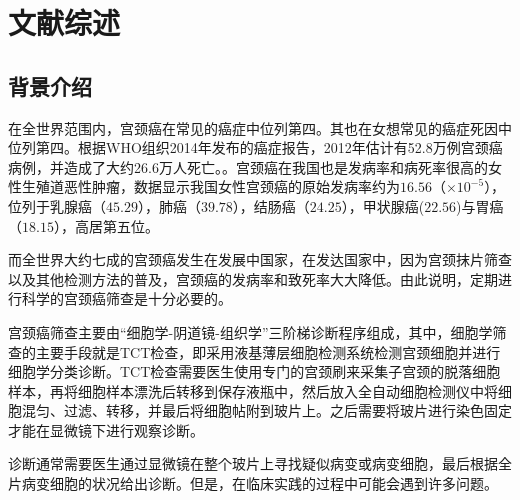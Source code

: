 \cleardoublepage
\chapter{文献综述}

\section{背景介绍}
\par 在全世界范围内，宫颈癌在常见的癌症中位列第四。其也在女想常见的癌症死因中位列第四。\cite{wild2014world}根据WHO组织2014年发布的癌症报告，2012年估计有52.8万例宫颈癌病例，并造成了大约26.6万人死亡。\cite{wild2014world}。宫颈癌在我国也是发病率和病死率很高的女性生殖道恶性肿瘤，数据显示我国女性宫颈癌的原始发病率约为$16.56$（$\times 10^{-5}$），位列于乳腺癌（$45.29$），肺癌（$39.78$），结肠癌（$24.25$），甲状腺癌($22.56$)与胃癌（$18.15$），高居第五位。\cite{2015癌症报告}
\par 而全世界大约七成的宫颈癌发生在发展中国家\cite{wild2014world}，在发达国家中，因为宫颈抹片筛查以及其他检测方法的普及，宫颈癌的发病率和致死率大大降低。\cite{canavan2000cervical}由此说明，定期进行科学的宫颈癌筛查是十分必要的。
\par 宫颈癌筛查主要由“细胞学-阴道镜-组织学”三阶梯诊断程序组成，其中，细胞学筛查的主要手段就是TCT检查，即采用液基薄层细胞检测系统检测宫颈细胞并进行细胞学分类诊断。TCT检查需要医生使用专门的宫颈刷来采集子宫颈的脱落细胞样本，再将细胞样本漂洗后转移到保存液瓶中，然后放入全自动细胞检测仪中将细胞混匀、过滤、转移，并最后将细胞帖附到玻片上。之后需要将玻片进行染色固定才能在显微镜下进行观察诊断。
\par 诊断通常需要医生通过显微镜在整个玻片上寻找疑似病变或病变细胞，最后根据全片病变细胞的状况给出诊断。但是，在临床实践的过程中可能会遇到许多问题。

